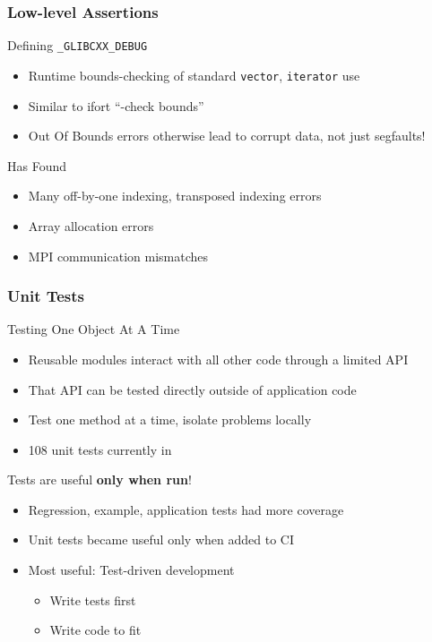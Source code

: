 \begin{frame}
\frametitle{Low-level Assertions}
\begin{block}{Defining \texttt{\_GLIBCXX\_DEBUG}}
\begin{itemize}
\item Runtime bounds-checking of standard \texttt{vector},
\texttt{iterator} use
\item Similar to ifort ``-check bounds''
\item Out Of Bounds errors otherwise lead to corrupt data, not just
segfaults!
\end{itemize}
\end{block}

\pause

\begin{block}{Has Found}
\begin{itemize}
\item Many off-by-one indexing, transposed indexing errors
\item Array allocation errors
\item MPI communication mismatches
\end{itemize}
\end{block}
\end{frame}


\begin{frame}
\frametitle{Unit Tests}
\begin{block}{Testing One Object At A Time}
\begin{itemize}
\item Reusable modules interact with all other code through a limited
API
\item That API can be tested directly outside of application code
\item Test one method at a time, isolate problems locally
\item 108 unit tests currently in \libMesh
\end{itemize}
\end{block}

\pause

\begin{block}{Tests are useful {\bf only when run}!}
\begin{itemize}
\item Regression, example, application tests had more coverage
\item Unit tests became useful only when added to CI
\item Most useful: Test-driven development
\begin{itemize}
    \item Write tests first
    \item Write code to fit
\end{itemize}
\end{itemize}
\end{block}
\end{frame}

